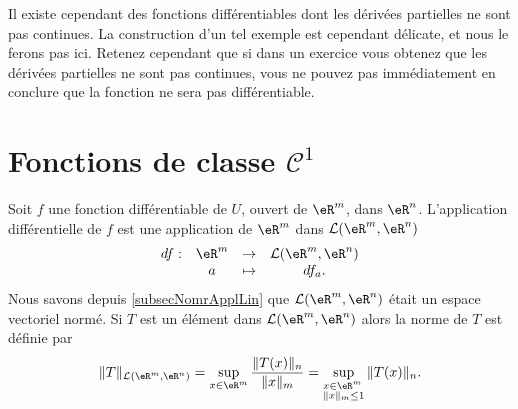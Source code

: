 \begin{remark}
	Il existe cependant des fonctions différentiables dont les dérivées partielles ne sont pas continues. La construction d'un tel exemple est cependant délicate, et nous le ferons pas ici. Retenez cependant que si dans un exercice vous obtenez que les dérivées partielles ne sont pas continues, vous ne pouvez pas immédiatement en conclure que la fonction ne sera pas différentiable.	 
\end{remark}




\section{Fonctions de classe $\mathcal{C}^1$}

Soit $f$ une fonction différentiable de $U$, ouvert de $\eR^m$, dans $\eR^n$. L'application différentielle de $f$ est une application  de $\eR^m$ dans $\mathcal{L}(\eR^m, \eR^n)$ 
\begin{equation}
  \begin{array}{rccc}
    df : & \eR^m & \to & \mathcal{L}(\eR^m, \eR^n)\\
& a& \mapsto & df_a.
  \end{array}
\end{equation}
Nous savons depuis \ref{subsecNomrApplLin} que $\mathcal{L}(\eR^m, \eR^n)$ était un espace vectoriel normé. Si $T$ est un élément dans $\mathcal{L}(\eR^m, \eR^n)$ alors la norme de $T$ est définie par 
\[
\|T\|_{\mathcal{L}(\eR^m, \eR^n)}=\sup_{x\in\eR^m} \frac{\|T(x)\|_n}{\|x\|_m}=\sup_{\begin{subarray}{l}
    x\in\eR^m\\
\|x\|_m\leq 1
  \end{subarray}} \|T(x)\|_n.
\]

